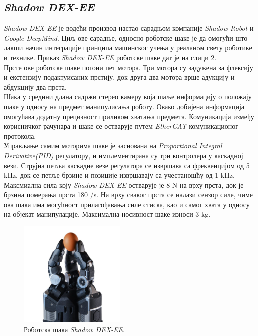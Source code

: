 \documentclass{article}
\begin{document}
\subsection{\textit{Shadow DEX-EE}}
\textit{Shadow DEX-EE} је водећи производ настао сарадњом компаније \textit{Shadow Robot} и 
\textit{Google DeepMind}. Циљ ове сарадње, односно роботске шаке је да омогући што лакши 
начин интеграције принципа машинског учења у реаланoм свету роботике и технике. Приказ \textit{Shadow DEX-EE} роботске
шаке дат је на слици 2.\\
Прсте ове роботске шаке погони пет мотора. Три мотора су задужена за флексију и екстензију подактуисаних прстију, док друга два мотора 
врше адукцију и абдукцију два прста. \\
Шака у средини длана садржи стерео камеру која шаље информацију о положају шаке у односу на предмет манипулисања роботу.
Овако добијена информација омогућава додатну прецизност приликом хватања предмета. Комуникација
између корисничког рачунара и шаке се остварује путем \textit{EtherCAT} комуникационог протокола.\\ 
Управљање самим моторима шаке је заснована на \textit{Proportional Integral Derivative(PID)} \cite{pid} регулатору, 
и имплементирана су три контролера у каскадној вези. Струјна петља каскадне везе регулатора се извршава са фреквенцијом 
од 5 kHz, док се петље брзине и позиције извршавају са учестаношћу од 1 kHz.\\
Максмиална сила коју \textit{Shadow DEX-EE} остварује је 8 N на врху прста, док је брзина померања прста 180 \degree/s.
На врху сваког прста се налази сензор силе, чиме ова шака има могућност прилагођавања силе стиска, 
као и самог хвата у односу на објекат манипулације. Максимална носивност шаке износи 3 kg. \cite{shadow_rob}
\begin{figure}[H]
\centering
\includegraphics[width=2in, height=2in]{Images/Saka1.jpg}
\caption{Роботска шака \textit{Shadow DEX-EE}. \cite{shadow_rob}}
\label{fig:figure2}
\end{figure}
\end{document}
